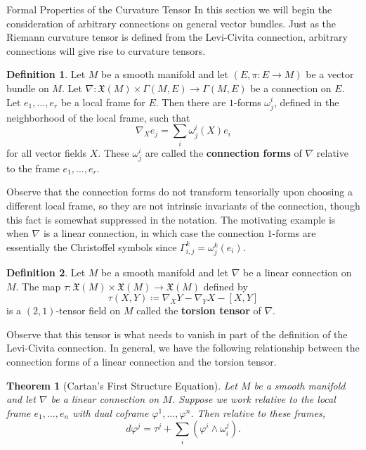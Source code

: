 \documentclass{article}
\numberwithin{equation}{subsection}
\newtheorem{theorem}{Theorem}[subsection]
\theoremstyle{definition}
\newtheorem{definition}{Definition}[subsection]
\begin{document}
\begin{section}{Formal Properties of the Curvature Tensor}
In this section we will begin the consideration of arbitrary connections on general vector bundles. Just as the Riemann curvature tensor is defined from the Levi-Civita connection, arbitrary connections will give rise to curvature tensors.

\begin{definition}
Let $M$ be a smooth manifold and let $(E,\pi\colon E\to M)$ be a vector bundle on $M$. Let $\nabla\colon\mathfrak{X}(M)\times\Gamma(M,E)\to\Gamma(M,E)$ be a connection on $E$. Let $e_1,\dots,e_r$ be a local frame for $E$. Then there are $1$-forms $\omega_j^i$, defined in the neighborhood of the local frame, such that
\begin{equation}\label{eq2.0.1}
\nabla_Xe_j=\sum_i{\omega_j^i(X)e_i}
\end{equation}
for all vector fields $X$. These $\omega_j^i$ are called the \textbf{connection forms} of $\nabla$ relative to the frame $e_1,\dots,e_r$.
\end{definition}

Observe that the connection forms do not transform tensorially upon choosing a different local frame, so they are not intrinsic invariants of the connection, though this fact is somewhat suppressed in the notation. The motivating example is when $\nabla$ is a linear connection, in which case the connection $1$-forms are essentially the Christoffel symbols since $\Gamma_{i,j}^k=\omega_j^k(e_i)$.

\begin{definition}
Let $M$ be a smooth manifold and let $\nabla$ be a linear connection on $M$. The map $\tau\colon\mathfrak{X}(M)\times\mathfrak{X}(M)\to\mathfrak{X}(M)$ defined by
\begin{equation}\label{eq2.0.2}
\tau(X,Y)\coloneqq \nabla_{X}Y-\nabla_{Y}X-[X,Y]
\end{equation}
is a $(2,1)$-tensor field on $M$ called the \textbf{torsion tensor} of $\nabla$.
\end{definition}

Observe that this tensor is what needs to vanish in part of the definition of the Levi-Civita connection. In general, we have the following relationship between the connection forms of a linear connection and the torsion tensor.

\begin{theorem}[Cartan's First Structure Equation]
Let $M$ be a smooth manifold and let $\nabla$ be a linear connection on $M$. Suppose we work relative to the local frame $e_1,\dots,e_n$ with dual coframe $\varphi^1,\dots,\varphi^n$. Then relative to these frames,
\begin{equation}\label{eq2.0.3}
d\varphi^j=\tau^j+\sum_{i}{(\varphi^i\wedge\omega_i^j)}.
\end{equation}
\end{theorem}
\end{section}


\clearpage



\end{document}
